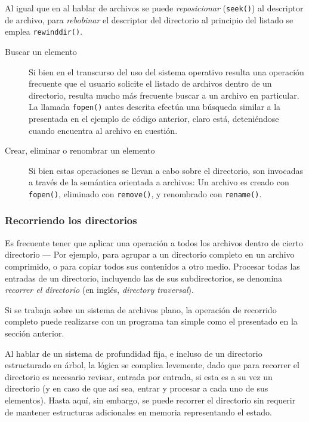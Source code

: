 \documentclass[11pt,fleqn]{book} %
\begin{document}
     Al igual que en al hablar de archivos se puede \emph{reposicionar}
     (\texttt{seek()}) al descriptor de archivo, para \emph{rebobinar} el
     descriptor del directorio al principio del listado se emplea
     \texttt{rewinddir()}.

\begin{description}
\item[Buscar un elemento] Si bien en el transcurso del uso del sistema
     operativo resulta una operación frecuente que el usuario solicite
     el listado de archivos dentro de un directorio, resulta mucho más
     frecuente buscar a un archivo en particular. La llamada \texttt{fopen()}
     antes descrita efectúa una búsqueda similar a la presentada en el
     ejemplo de código anterior, claro está, deteniéndose cuando
     encuentra al archivo en cuestión.
\item[Crear, eliminar o renombrar un elemento] Si bien estas operaciones
     se llevan a cabo sobre el directorio, son invocadas a través de
     la semántica orientada a archivos: Un archivo es creado con
     \texttt{fopen()}, eliminado con \texttt{remove()}, y renombrado con \texttt{rename()}.
\end{description}
\subsubsection{Recorriendo los directorios}
\label{sec-6-3-2-1}
\label{DIR_dir_traversal}


Es frecuente tener que aplicar una operación a todos los archivos
dentro de cierto directorio — Por ejemplo, para agrupar a un
directorio completo en un archivo comprimido, o para copiar
todos sus contenidos a otro medio. Procesar todas las entradas de un
directorio, incluyendo las de sus subdirectorios, se denomina
\emph{recorrer el directorio} (en inglés, \emph{directory traversal}).

Si se trabaja sobre un sistema de archivos plano, la operación de
recorrido completo puede realizarse con un programa tan simple como el
presentado en la sección anterior.

Al hablar de un sistema de profundidad fija, e incluso de un
directorio estructurado en árbol, la lógica se complica levemente,
dado que para recorrer el directorio es necesario revisar, entrada por
entrada, si esta es a su vez un directorio (y en caso de que así sea,
entrar y procesar a cada uno de sus elementos). Hasta aquí, sin
embargo, se puede recorrer el directorio sin requerir de mantener
estructuras adicionales en memoria representando el estado.
\end{document}
